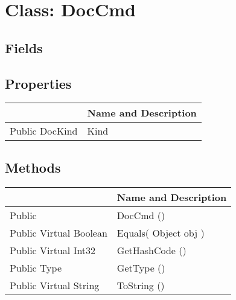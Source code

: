 \documentclass[11pt, oneside, a4paper]{book}
\begin{document}
\hypertarget{SoftwareEngineeringTools.{}Documentation.{}DocCmd}{}
\section{Class: DocCmd}

\subsection{Fields}

\subsection{Properties}
\begin{center}
\begin{tabular}{| p{3cm} | p{12cm} | }
\hline
\textbf{ } & \textbf{ Name and Description}\\
\hline
 Public  DocKind &  Kind\hypertarget{SoftwareEngineeringTools.{}Documentation.{}DocCmd.{}Kind}{}\\
\hline
\end{tabular}
\end{center}

\subsection{Methods}
\begin{center}
\begin{tabular}{| p{3cm} | p{12cm} | }
\hline
\textbf{ } & \textbf{ Name and Description}\\
\hline
 Public  &  DocCmd ()\hypertarget{SoftwareEngineeringTools.{}Documentation.{}DocCmd.{}DocCmd}{}\\
\hline
 Public  Virtual  Boolean &  Equals(\hypertarget{SoftwareEngineeringTools.{}Documentation.{}DocCmd.{}Equals\_Object}{} Object  obj  )\\
\hline
 Public  Virtual  Int32 &  GetHashCode ()\hypertarget{SoftwareEngineeringTools.{}Documentation.{}DocCmd.{}GetHashCode}{}\\
\hline
 Public  Type &  GetType ()\hypertarget{SoftwareEngineeringTools.{}Documentation.{}DocCmd.{}GetType}{}\\
\hline
 Public  Virtual  String &  ToString ()\hypertarget{SoftwareEngineeringTools.{}Documentation.{}DocCmd.{}ToString}{}\\
\hline
\end{tabular}
\end{center}
 
\end{document}
